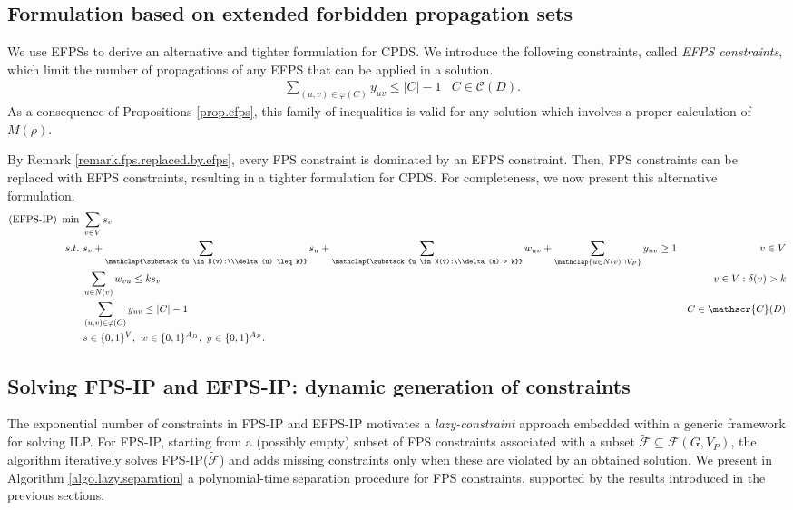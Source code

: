 \documentclass{article}
\newcommand{\FF}{{\mathcal F}}
\newcommand{\CC}{{\mathscr C}}
\newcommand{\FPSIP}{FPS-IP\xspace}
\newcommand{\FPSIPF}[1]{FPS-IP(#1)}
\newcommand{\EFPSIP}{EFPS-IP\xspace}
\begin{document}
\subsection{Formulation based on extended forbidden propagation sets}

We use EFPSs to derive an alternative and tighter formulation for CPDS.
We introduce the following constraints, called \emph{EFPS constraints}, which limit the number of propagations of any EFPS that can be applied in a solution.
\begin{align}\label{FPSIP.EFPS}
& \sum_{(u,v) \in \varphi(C)} y_{uv} \leq |C|-1 & C \in \CC(D).
\end{align}
As a consequence of Propositions \ref{prop.efps}, this family of inequalities is valid for any solution which involves a proper calculation of $M(\rho)$.

By Remark \ref{remark.fps.replaced.by.efps}, every FPS constraint is dominated by an EFPS constraint.
Then, FPS constraints can be replaced with EFPS constraints, resulting in a tighter formulation for CPDS.
For completeness, we now present this alternative formulation.
\begin{align*}
\text{(\EFPSIP)}\ \min\  & \sum_{v \in V} s_v\\
s.t.\  & s_v + \sum_{\mathclap{\substack{u \in N(v):\\\delta(u) \leq k}}} s_u + \sum_{\mathclap{\substack{u \in N(v):\\\delta(u) > k}}} w_{uv} + \sum_{\mathclap{u \in N(v) \cap V_P}} y_{uv} \geq 1 & v \in V \\
& \sum_{u \in N(v)} w_{vu} \leq ks_v & v \in V: \delta(v) > k \\
& \sum_{(u,v) \in \varphi(C)} y_{uv} \leq |C|-1 & C \in \mathscr{C}(D)\\
& s \in \{0,1\}^V,\ w \in \{0,1\}^{A_D},\ y \in \{0,1\}^{A_P}. \notag
\end{align*}

\subsection{Solving \FPSIP and \EFPSIP: dynamic generation of constraints}\label{sec.constraint.generation}

The exponential number of constraints in \FPSIP and \EFPSIP motivates a \emph{lazy-constraint} approach embedded within a generic framework for solving ILP.
For \FPSIP, starting from a (possibly empty) subset of FPS constraints associated with a subset $\tilde \FF \subseteq \FF(G, V_P)$, the algorithm iteratively solves \FPSIPF{$\tilde \FF$} and adds missing constraints only when these are violated by an obtained solution.
We present in Algorithm \ref{algo.lazy.separation} a polynomial-time separation procedure for FPS constraints, supported by the results introduced in the previous sections.
\end{document}
